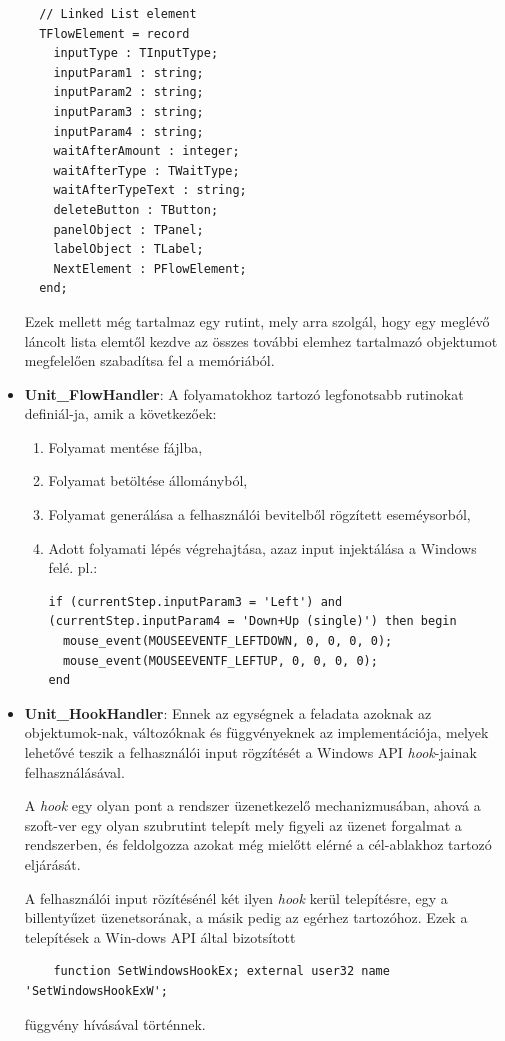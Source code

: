 \begin{itemize}
{\begin{lstlisting}
  // Linked List element
  TFlowElement = record
    inputType : TInputType;
    inputParam1 : string;
    inputParam2 : string;
    inputParam3 : string;
    inputParam4 : string;
    waitAfterAmount : integer;
    waitAfterType : TWaitType;
    waitAfterTypeText : string;
    deleteButton : TButton;
    panelObject : TPanel;
    labelObject : TLabel;
    NextElement : PFlowElement;
  end;
	\end{lstlisting}

	Ezek mellett még tartalmaz egy rutint, mely arra szolgál, hogy egy meglévő láncolt lista elemtől kezdve az összes további elemhez tartalmazó objektumot megfelelően szabadítsa fel a memóriából.

	}
	\item{
		\textbf{Unit\_FlowHandler}: A folyamatokhoz tartozó legfonotsabb rutinokat definiál\hyp{}ja, amik a következőek:
		\begin{enumerate}
			\item{Folyamat mentése fájlba,}
			\item{Folyamat betöltése állományból,}
			\item{Folyamat generálása a felhasználói bevitelből rögzített eseméysorból,}
			\item{Adott folyamati lépés végrehajtása, azaz input injektálása a Windows felé. pl.:
				\begin{lstlisting}
if (currentStep.inputParam3 = 'Left') and (currentStep.inputParam4 = 'Down+Up (single)') then begin
  mouse_event(MOUSEEVENTF_LEFTDOWN, 0, 0, 0, 0);
  mouse_event(MOUSEEVENTF_LEFTUP, 0, 0, 0, 0);
end 
				\end{lstlisting}
			} 
			
		\end{enumerate}
	}
	\item{
		\textbf{Unit\_HookHandler}: Ennek az egységnek a feladata azoknak az objektumok\hyp{}nak, változóknak és függvényeknek az implementációja, melyek lehetővé teszik a felhasználói input rögzítését a Windows API \textit{hook}-jainak felhasználásával.

A \textit{hook} egy olyan pont a rendszer üzenetkezelő mechanizmusában, ahová a szoft\hyp{}ver egy olyan szubrutint telepít mely figyeli az üzenet forgalmat a rendszerben, és feldolgozza azokat még mielőtt elérné a cél-ablakhoz tartozó eljárását.

A felhasználói input rözítésénél két ilyen \textit{hook} kerül telepítésre, egy a billentyűzet üzenetsorának, a másik pedig az egérhez tartozóhoz. Ezek a telepítések a Win\hyp{}dows API által bizotsított
\begin{lstlisting}
	function SetWindowsHookEx; external user32 name 'SetWindowsHookExW';
\end{lstlisting}
függvény hívásával történnek.

}
\end{itemize}
